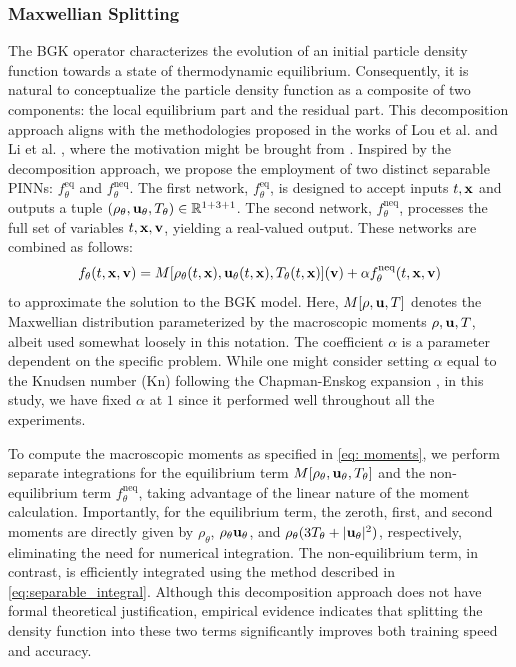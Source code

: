 \documentclass[preprint,12pt]{elsarticle}
\begin{document}
\subsubsection{Maxwellian Splitting}
The BGK operator characterizes the evolution of an initial particle density function towards a state of thermodynamic equilibrium.
Consequently, it is natural to conceptualize the particle density function as a composite of two components: the local equilibrium part and the residual part.
This decomposition approach aligns with the methodologies proposed in the works of Lou et al. \cite{lou2021physics} and Li et al. \cite{li2023solving}, where the motivation might be brought from \cite{bennoune2008uniformly,jin2010micro}.
Inspired by the decomposition approach, we propose the employment of two distinct separable PINNs: $f_\theta^\mathrm{eq}$ and $f_\theta^\mathrm{neq}$.
The first network, $f_\theta^\mathrm{eq}$, is designed to accept inputs $t, {\bf x}$ and outputs a tuple $(\rho_\theta, {\bf u}_\theta, T_\theta) \in \mathbb{R}^{1+3+1}$. 
The second network, $f_\theta^\mathrm{neq}$, processes the full set of variables $t, {\bf x, v}$, yielding a real-valued output. These networks are combined as follows:
\begin{equation}\label{eq:maxwellian_splitting}
    f_\theta(t,{\bf x, v}) = M[\rho_\theta(t, {\bf x}), {\bf u}_\theta(t, {\bf x}), T_\theta(t, {\bf x})]({\bf v}) + \alpha f_\theta^\mathrm{neq}(t, {\bf x, v})
\end{equation}
to approximate the solution to the BGK model.
Here, $M[\rho, {\bf u}, T]$ denotes the Maxwellian distribution parameterized by the macroscopic moments $\rho, {\bf u}, T$, albeit used somewhat loosely in this notation.
The coefficient $\alpha$ is a parameter dependent on the specific problem.
While one might consider setting $\alpha$ equal to the Knudsen number (Kn) following the Chapman-Enskog expansion \cite{chapman1990mathematical}, in this study, we have fixed $\alpha$ at \(1\) since it performed well throughout all the experiments.


To compute the macroscopic moments as specified in \eqref{eq: moments}, we perform separate integrations for the equilibrium term $M[\rho_\theta, {\bf u}_\theta, T_\theta]$ and the non-equilibrium term $f_\theta^\mathrm{neq}$, taking advantage of the linear nature of the moment calculation.
Importantly, for the equilibrium term, the zeroth, first, and second moments are directly given by $\rho_\theta$, $\rho_\theta {\bf u}_\theta$, and $\rho_\theta (3 T_\theta + |{\bf u}_\theta|^2)$, respectively, eliminating the need for numerical integration.
The non-equilibrium term, in contrast, is efficiently integrated using the method described in \eqref{eq:separable_integral}.
Although this decomposition approach does not have formal theoretical justification, empirical evidence indicates that splitting the density function into these two terms significantly improves both training speed and accuracy.
\end{document}

